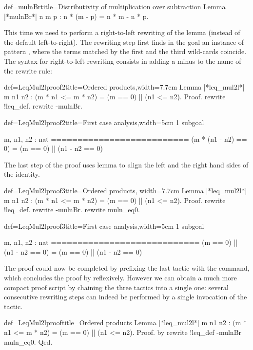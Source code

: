 \begin{coq}{def=mulnBr}{title=Distributivity of multiplication over subtraction}
Lemma |*mulnBr*| n m p : n * (m - p) = n * m - n * p.
\end{coq}
This time we need to perform a right-to-left rewriting of the
 lemma (instead of the
default left-to-right). The rewriting step first finds in the goal an
instance of pattern \C{(_ * _ - _ * _)}, where the terms matched by
the first and the third wild-cards coincide. The syntax for
right-to-left rewriting consists in adding a minus \C{-} to the name
of the rewrite rule:


\begin{coq}{def=LeqMul2lproof2}{title=Ordered products,width=7.7cm}
Lemma |*leq_mul2l*| m n1 n2 :
(m * n1 <= m * n2) = (m == 0) || (n1 <= n2).
Proof.
rewrite !leq_def.
rewrite -mulnBr.
\end{coq}
\begin{coqout}{def=LeqMul2lproof2}{title=First case analysis,width=5cm}
1 subgoal

m, n1, n2 : nat
==========================
(m * (n1 - n2) == 0) =
(m == 0) || (n1 - n2 == 0)
\end{coqout}

The last step of the proof uses lemma  to align the left
and the right hand sides of the identity.

\begin{coq}{def=LeqMul2lproof3}{title=Ordered products, width=7.7cm}
Lemma |*leq_mul2l*| m n1 n2 :
(m * n1 <= m * n2) = (m == 0) || (n1 <= n2).
Proof.
rewrite !leq_def.
rewrite -mulnBr.
rewrite muln_eq0.
\end{coq}
\begin{coqout}{def=LeqMul2lproof3}{title=First case analysis,width=5cm}
1 subgoal

m, n1, n2 : nat
============================
(m == 0) || (n1 - n2 == 0) =
(m == 0) || (n1 - n2 == 0)
\end{coqout}

The proof could now be completed by prefixing the last tactic with the
 command, which concludes the proof by reflexively. However we
can obtain a much more compact proof script by chaining the three
tactics into a single one: several consecutive rewriting steps can
indeed be performed by a single invocation of the  tactic.

\begin{coq}{def=LeqMul2lproof}{title=Ordered products}
Lemma |*leq_mul2l*| m n1 n2 : (m * n1 <= m * n2) = (m == 0) || (n1 <= n2).
Proof. by rewrite !leq_def -mulnBr muln_eq0. Qed.
\end{coq}

